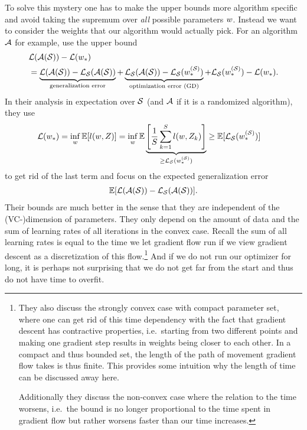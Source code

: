 To solve this mystery one has to make the upper bounds more algorithm specific
and avoid taking the supremum over \emph{all} possible parameters \(w\).
Instead we want to consider the weights that our algorithm would actually pick.
For an algorithm \(\mathcal{A}\) for example,
\textcite{hardtTrainFasterGeneralize2016} use the upper bound
\begin{align*}
	&\mathcal{L}(\mathcal{A}(\mathcal{S})) - \mathcal{L}(w_*)\\
	&= \underbrace{\mathcal{L}(\mathcal{A}(\mathcal{S})) - \mathcal{L}_{\mathcal{S}}(\mathcal{A}(\mathcal{S}))}_{
		\text{generalization error}
	}
	+ \underbrace{\mathcal{L}_{\mathcal{S}}(\mathcal{A}(\mathcal{S})) - \mathcal{L}_{\mathcal{S}}(w_*^{(\mathcal{S})})}_{\text{optimization error (GD)}}
	+ \mathcal{L}_{\mathcal{S}}(w_*^{(\mathcal{S})}) - \mathcal{L}(w_*).
\end{align*}
In their analysis in expectation over \(\mathcal{S}\) (and \(\mathcal{A}\) if it is a
randomized algorithm), they use
\begin{align*}
	\mathcal{L}(w_*) &= \inf_{w}\mathbb{E}[l(w, Z)]
	= \inf_{w}\mathbb{E}\underbrace{
		\left[\frac{1}{S}\sum_{k=1}^Sl(w, Z_k)\right]
	}_{\ge \mathcal{L}_{\mathcal{S}}(w_*^{(\mathcal{S})})}
	\ge \mathbb{E}[\mathcal{L}_{\mathcal{S}}(w_*^{(\mathcal{S})})]
\end{align*}
to get rid of the last term and focus on the expected generalization error
\begin{align*}
	\mathbb{E}[\mathcal{L}(\mathcal{A}(\mathcal{S})) - \mathcal{L}_{\mathcal{S}}(\mathcal{A}(\mathcal{S}))].
\end{align*}
Their bounds are much better in the sense that they are independent of
the (VC-)dimension of parameters. They only depend on the amount of data and
the sum of learning rates of all iterations in the convex case. Recall the sum of
all learning rates is equal to the time we let gradient flow run if we view
gradient descent as a discretization of this flow.\footnote{
	They also discuss the strongly convex case with compact parameter set, where
	one can get rid of this time dependency with the fact that gradient descent
	has contractive properties, i.e.\ starting from two different points and
	making one gradient step results in weights being closer to each other. 
	In a compact and thus bounded set, the length of the path of movement gradient
	flow takes is thus finite. This provides some intuition why the length
	of time can be discussed away here.

	Additionally they discuss the non-convex case where the relation to the time worsens,
	i.e.\ the bound is no longer proportional to the time spent in gradient flow
	but rather worsens faster than our time increases.
} And if we do not run our optimizer for long, it is perhaps not surprising that
we do not get far from the start and thus do not have time to overfit.

